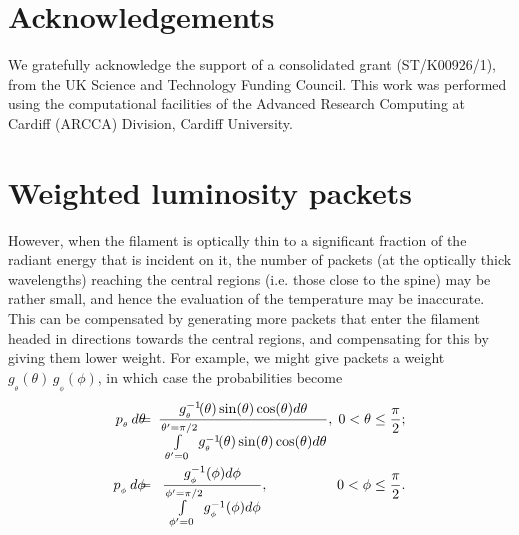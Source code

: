 \documentclass[usenatbib]{mn2e}
\numberwithin{equation}{section}
\begin{document}
\vspace{2.0cm}

\section*{Acknowledgements}

We gratefully acknowledge the support of a consolidated grant (ST/K00926/1), from the UK Science and Technology Funding Council. This work was performed using the computational facilities of the Advanced Research Computing at Cardiff (ARCCA) Division, Cardiff University. 




\appendix





\section{Weighted luminosity packets}\label{APP:LPWeighting}

However, when the filament is optically thin to a significant fraction of the radiant energy that is incident on it, the number of packets (at the optically thick wavelengths) reaching the central regions (i.e. those close to the spine) may be rather small, and hence the evaluation of the temperature may be inaccurate. This can be compensated by generating more packets that enter the filament headed in directions towards the central regions, and compensating for this by giving them lower weight. For example, we might give packets a weight $g_{_\theta}\!(\theta)\,g_{_\phi}\!(\phi)$, in which case the probabilities become
\begin{eqnarray}
p_{_\theta}\,d\theta\!\!&\!\!=\!\!\!&\!\frac{g_{_\theta}^{-1}\!(\theta)\sin(\theta)\cos(\theta)d\theta}{\int\limits_{\theta'=0}^{\theta'=\pi/2}g_{_\theta}^{-1}\!(\theta)\sin(\theta)\cos(\theta)d\theta},\;0<\theta\leq\frac{\pi}{2};\\
p_{_\phi}\,d\phi\!\!&\!\!=\!\!&\!\!\frac{g_{_\phi}^{-1}(\phi)d\phi}{\int\limits_{\phi'=0}^{\phi'=\pi/2}g_{_\phi}^{-1}(\phi)d\phi},\hspace{1.72cm}0<\phi\leq\frac{\pi}{2}.
\end{eqnarray}
\end{document}

